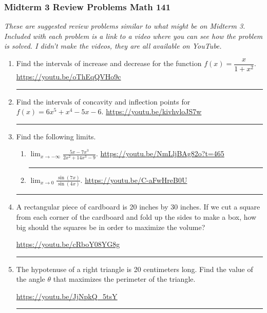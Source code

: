 \documentclass[12pt]{article}
\newcommand{\ds}{\displaystyle}
\begin{document}
\pagestyle{empty}
\subsubsection*{Midterm 3 Review Problems \hfill Math 141 }
\textit{These are suggested review problems similar to what might be on Midterm 3. Included with each problem is a link to a video where you can see how the problem is solved. I didn't make the videos, they are all  available on YouTube.}

\begin{enumerate}
\item Find the intervals of increase and decrease for the function $f(x) = \dfrac{x}{1+x^2}$.
\vfill 
\hfill  \url{https://youtu.be/oThEqQVHo9c} 
\hrule 

\item Find the intervals of concavity and inflection points for $f(x) = 6x^5 + x^4 - 5x -6$.
\vfill 
\hfill  \url{https://youtu.be/kivhvloJS7w} 
\hrule 

\item Find the following limits.
\begin{enumerate}
\item $\ds \lim_{x \rightarrow -\infty} \frac{5x-7x^3}{2x^2 + 14x^3 - 9}$. 
\vfill
\hfill \url{https://youtu.be/NmLljBAg82o?t=465}
\hrule

\item $\ds \lim_{x \rightarrow 0} \frac{\sin(7x)}{\sin(4x)}$. 
\vfill
\hfill \url{https://youtu.be/C-aFwHreB0U}
\end{enumerate}
\hrule


\newpage
\item A rectangular piece of cardboard is 20 inches by 30 inches.  If we cut a square from each corner of the cardboard and fold up the sides to make a box, how big should the squares be in order to maximize the volume?  
\begin{flushright}
\end{flushright}
\vfill
\hfill \url{https://youtu.be/cRboY08YG8g}
\hrule

\item The hypotenuse of a right triangle is 20 centimeters long.  Find the value of the angle $\theta$ that maximizes the perimeter of the triangle. 
\begin{flushright}
\end{flushright}
\vfill
\hfill \url{https://youtu.be/JjNpkQ_5tsY}
\hrule


\end{enumerate}
\end{document}
